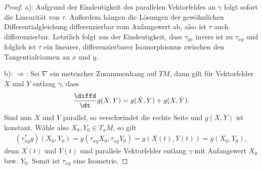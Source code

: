 \documentclass[%
	paper=a5,%
	fleqn,%
	DIV=18,%
	BCOR=0mm,
	fontsize=11pt,
	titlepage=false,%
	bibliography=totoc,
	DIV=18,%
	twoside=true,
	pdftitle=Riemannsche Geometrie,
	pdfauthor=Uwe Semmelmann,
	numbers=noendperiod]%
	{scrbook}
\begin{document}
\begin{proof}
a): Aufgrund der Eindeutigkeit des parallelen Vektorfeldes an $\gamma$ folgt
sofort die Linearität von $\tau$. Außerdem hängen die Lösungen der gewöhnlichen
Differentialgleichung differenzierbar vom Anfangswert ab, also ist $\tau$ auch
differenzierbar. Letztlich folgt aus der Eindeutigkeit, dass $\tau_{yx}$ invers
ist zu $\tau_{xy}$ und folglich ist $\tau$ ein linearer, differenzierbarer
Isomorphismus zwischen den Tangentialräumen an $x$ und $y$.

b): $\Rightarrow$: Sei $\nabla$ ein metrischer Zusammenhang auf $TM$, dann gilt
für Vektorfelder $X$ und $Y$ entlang $\gamma$, dass
\begin{align*}
\frac{\diffd}{\dt} g(X,Y) = g(\dot{X},Y) + g(X,\dot{Y}).
\end{align*}
Sind nun $X$ und $Y$ parallel, so verschwindet die rechte Seite und $g(X,Y)$ ist
konstant. Wähle also $X_0,Y_0\in T_xM$, so gilt
\begin{align*}
(\tau_{xy}^* g)(X_0,Y_0)
= g(\tau_{xy}X_0,\tau_{xy}Y_0) = g(X(t),Y(t)) = g(X_0,Y_0),
\end{align*}
denn $X(t)$ und $Y(t)$ sind parallele Vektorfelder entlang $\gamma$ mit
Anfangswert $X_0$ bzw. $Y_0$. Somit ist $\tau_{xy}$ eine Isometrie.


\end{proof}
\end{document}
